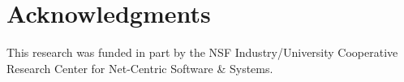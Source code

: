 \documentclass[nojss]{jss}
\begin{document}
\section*{Acknowledgments}
This research was funded in part by the NSF Industry/University Cooperative Research Center for Net-Centric Software \& Systems.



%
%
%
%

%

\end{document}
